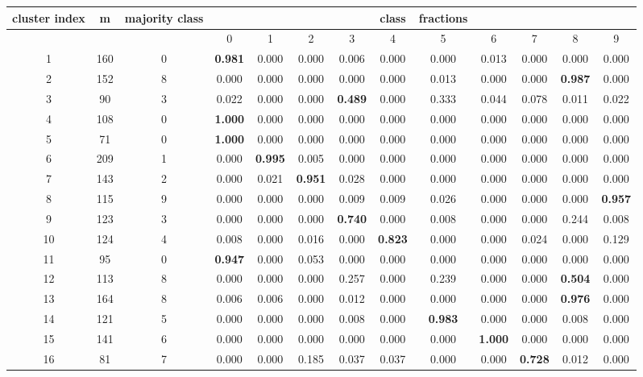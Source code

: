 \documentclass[a4paper,fleqn,usenatbib]{mnras}
\begin{document}
\begin{table*}
\centering
\begin{tabular}{|c|c|c|c|c|c|c|c|c|c|c|c|c|}
\hline
cluster index & m & majority class & & & & &class & fractions & & & & \\
\hline
   & & & 0 & 1 & 2 & 3 & 4 & 5 & 6 & 7 & 8 & 9 \\
\hline
\hline
1 & 160 & 0 & \textbf{0.981} & 0.000 & 0.000 & 0.006 & 0.000 & 0.000 & 0.013 & 0.000 & 0.000 & 0.000\\
2 & 152 & 8 & 0.000 & 0.000 & 0.000 & 0.000 & 0.000 & 0.013 & 0.000 & 0.000 & \textbf{0.987} & 0.000\\
3 & 90 & 3 & 0.022 & 0.000 & 0.000 & \textbf{0.489} & 0.000 & 0.333 & 0.044 & 0.078 & 0.011 & 0.022\\
4 & 108 & 0 & \textbf{1.000} & 0.000 & 0.000 & 0.000 & 0.000 & 0.000 & 0.000 & 0.000 & 0.000 & 0.000\\
5 & 71 & 0 & \textbf{1.000} & 0.000 & 0.000 & 0.000 & 0.000 & 0.000 & 0.000 & 0.000 & 0.000 & 0.000\\
6 & 209 & 1 & 0.000 & \textbf{0.995} & 0.005 & 0.000 & 0.000 & 0.000 & 0.000 & 0.000 & 0.000 & 0.000\\
7 & 143 & 2 & 0.000 & 0.021 & \textbf{0.951} & 0.028 & 0.000 & 0.000 & 0.000 & 0.000 & 0.000 & 0.000\\
8 & 115 & 9 & 0.000 & 0.000 & 0.000 & 0.009 & 0.009 & 0.026 & 0.000 & 0.000 & 0.000 & \textbf{0.957}\\
9 & 123 & 3 & 0.000 & 0.000 & 0.000 & \textbf{0.740} & 0.000 & 0.008 & 0.000 & 0.000 & 0.244 & 0.008\\
10 & 124 & 4 & 0.008 & 0.000 & 0.016 & 0.000 & \textbf{0.823} & 0.000 & 0.000 & 0.024 & 0.000 & 0.129\\
11 & 95 & 0 & \textbf{0.947} & 0.000 & 0.053 & 0.000 & 0.000 & 0.000 & 0.000 & 0.000 & 0.000 & 0.000\\
12 & 113 & 8 & 0.000 & 0.000 & 0.000 & 0.257 & 0.000 & 0.239 & 0.000 & 0.000 & \textbf{0.504} & 0.000\\
13 & 164 & 8 & 0.006 & 0.006 & 0.000 & 0.012 & 0.000 & 0.000 & 0.000 & 0.000 & \textbf{0.976} & 0.000\\
14 & 121 & 5 & 0.000 & 0.000 & 0.000 & 0.008 & 0.000 & \textbf{0.983} & 0.000 & 0.000 & 0.008 & 0.000\\
15 & 141 & 6 & 0.000 & 0.000 & 0.000 & 0.000 & 0.000 & 0.000 & \textbf{1.000} & 0.000 & 0.000 & 0.000\\
16 & 81 & 7 & 0.000 & 0.000 & 0.185 & 0.037 & 0.037 & 0.000 & 0.000 & \textbf{0.728} & 0.012 & 0.000\\

\end{tabular}
\end{table*}
\end{document}
